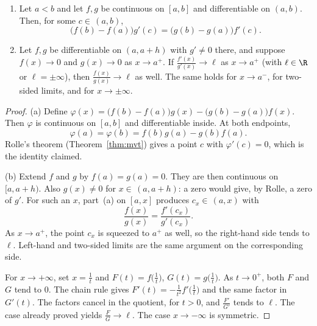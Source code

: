 \begin{theorem}\label{thm:lhopital}
\begin{enumerate}[label=(\alph*)]
\item Let $a<b$ and let $f,g$ be continuous on $[a,b]$ and differentiable on $(a,b)$. Then, for some $c\in\,(a,b)$,
\[
\bigl(f(b)-f(a)\bigr)g'(c)=\bigl(g(b)-g(a)\bigr)f'(c).
\]
\item Let $f,g$ be differentiable on $(a,a+h)$ with $g'\ne0$ there, and suppose $f(x)\to0$ and $g(x)\to0$ as $x\to a^+$. If $\frac{f'(x)}{g'(x)}\to\ell$ as $x\to a^+$ (with $\ell\in\R$ or $\ell=\pm\infty$), then $\frac{f(x)}{g(x)}\to\ell$ as well. The same holds for $x\to a^-$, for two-sided limits, and for $x\to\pm\infty$.
\end{enumerate}
\end{theorem}
\begin{proof}
(a) Define $\varphi(x)=\bigl(f(b)-f(a)\bigr)g(x)-\bigl(g(b)-g(a)\bigr)f(x)$. Then $\varphi$ is continuous on $[a,b]$ and differentiable inside. At both endpoints,
\[
\varphi(a)=\varphi(b)=f(b)g(a)-g(b)f(a).
\]
Rolle's theorem (Theorem~\ref{thm:mvt}) gives a point $c$ with $\varphi'(c)=0$, which is the identity claimed.

(b) Extend $f$ and $g$ by $f(a)=g(a)=0$. They are then continuous on $[a,a+h)$. Also $g(x)\ne0$ for $x\in\,(a,a+h)$: a zero would give, by Rolle, a zero of $g'$. For such an $x$, part~(a) on $[a,x]$ produces $c_x\in\,(a,x)$ with
\[
\frac{f(x)}{g(x)}=\frac{f'(c_x)}{g'(c_x)}.
\]
As $x\to a^+$, the point $c_x$ is squeezed to $a^+$ as well, so the right-hand side tends to $\ell$. Left-hand and two-sided limits are the same argument on the corresponding side.

For $x\to+\infty$, set $x=\frac1t$ and $F(t)=f\bigl(\frac1t\bigr)$, $G(t)=g\bigl(\frac1t\bigr)$. As $t\to0^+$, both $F$ and $G$ tend to $0$. The chain rule gives $F'(t)=-\frac1{t^2}f'\bigl(\frac1t\bigr)$ and the same factor in $G'(t)$. The factors cancel in the quotient, for $t>0$, and $\frac{F'}{G'}$ tends to $\ell$. The case already proved yields $\frac{F}{G}\to\ell$. The case $x\to-\infty$ is symmetric.
\end{proof}

